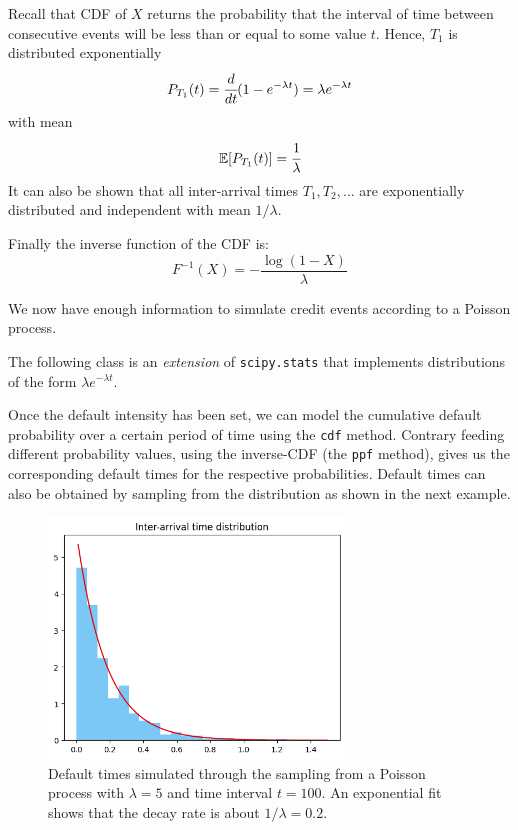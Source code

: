 Recall that CDF of $X$ returns the probability that the interval of time between consecutive events will be less than or equal to some value $t$.
Hence, $T_1$ is distributed exponentially
\begin{equation}
P_{T_1}(t) = \cfrac{d}{dt}(1-e^{-\lambda t}) = \lambda e^{-\lambda t}
\end{equation}
with mean  
\begin{equation}
\mathbb{E}[P_{T_1}(t)] = \cfrac{1}{\lambda}
\end{equation}
It can also be shown that all inter-arrival times $T_1, T_2,\ldots$ are exponentially distributed and independent with mean $1/\lambda$.

Finally the inverse function of the CDF is:
\begin{equation}
F^{-1}(X) = -\frac{\log(1-X)}{\lambda}
\end{equation}

\begin{finmarkets}
We now have enough information to simulate credit events according to a Poisson process. 

The following class is an \emph{extension} of \texttt{scipy.stats} that implements distributions of the form $\lambda e^{-\lambda t}$. %

Once the default intensity has been set, we can model the cumulative default probability over a certain period of time using the \texttt{cdf} method. Contrary feeding different probability values, using the inverse-CDF (the \texttt{ppf} method), gives us the corresponding default times for the respective probabilities.
Default times can also be obtained by sampling from the distribution as shown in the next example.
\end{finmarkets}


\begin{figure}[htb]
	\centering
	\includegraphics[width=0.7\textwidth]{figures/default_time_simulation}
	\caption{Default times simulated through the sampling from a Poisson process with $\lambda=5$ and time interval $t=100$. An exponential fit shows that the decay rate is about $1/\lambda=0.2$.}
	\label{fig:default_time_simulation}
\end{figure}

